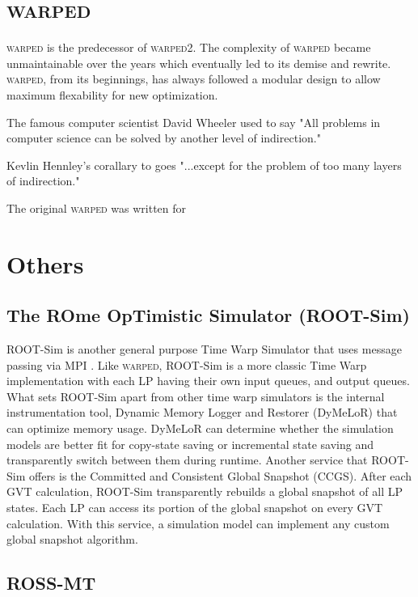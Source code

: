 \documentclass[11pt]{book}
\begin{document}
\section{\textsc{warped}}

\textsc{warped} is the predecessor of \textsc{warped2}. The complexity of \textsc{warped}
became unmaintainable over the years which eventually led to its demise and rewrite.
\textsc{warped}, from its beginnings, has always followed a modular design to allow maximum
flexability for new optimization.

The famous computer scientist David Wheeler used to say "All problems in computer science
can be solved by another level of indirection."

Kevlin Hennley's corallary to goes "...except for the problem of too many layers of
indirection."

The original \textsc{warped} was written for 

\section{Others}

\subsection{The ROme OpTimistic Simulator (ROOT-Sim)}

ROOT-Sim is another general purpose Time Warp Simulator that uses message passing via MPI
\cite{pellegrini-11}. Like \textsc{warped}, ROOT-Sim is a more classic Time Warp
implementation with each LP having their own input queues, and output queues. What sets
ROOT-Sim apart from other time warp simulators is the internal instrumentation tool, Dynamic
Memory Logger and Restorer (DyMeLoR) that can optimize memory usage. DyMeLoR can determine
whether the simulation models are better fit for copy-state saving or incremental state
saving and transparently switch between them during runtime. Another service that ROOT-Sim
offers is the Committed and Consistent Global Snapshot (CCGS). After each GVT calculation,
ROOT-Sim transparently rebuilds a global snapshot of all LP states. Each LP can access its
portion of the global snapshot on every GVT calculation. With this service, a simulation
model can implement any custom global snapshot algorithm.

\subsection{ROSS-MT}
\end{document}
